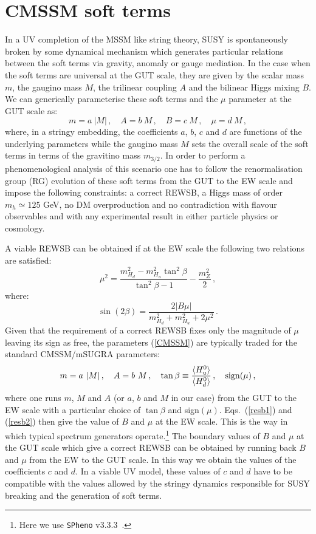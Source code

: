 \documentclass[11pt,a4paper]{article}
\newcommand{\be}{\begin{equation}}
\newcommand{\ee}{\end{equation}}
\begin{document}
\section{CMSSM soft terms}

In a UV completion of the MSSM like string theory, SUSY is spontaneously
broken by some dynamical mechanism which generates particular relations
between the soft terms via gravity, anomaly or gauge mediation. In the
case when the soft terms are universal at the GUT scale, they are given by
the scalar mass $m$, the gaugino mass $M$, the trilinear coupling $A$ and
the bilinear Higgs mixing $B$. We can generically parameterise these soft
terms and the $\mu$ parameter at the GUT scale as:
\be
m = a\ |M|\,,\quad A = b\ M\,,\quad B = c \ M\,, \quad \mu = d\ M\,,
\label{CMSSM}
\ee
where, in a stringy embedding, the coefficients $a$, $b$, $c$ and $d$ are
functions of the underlying parameters while the gaugino mass $M$ sets the
overall scale of the soft terms in terms of the gravitino mass $m_{3/2}$.
In order to perform a phenomenological analysis of this scenario one has
to follow the renormalisation group (RG) evolution of these soft terms
from the GUT to the EW scale and impose the following constraints: a
correct REWSB, a Higgs mass of order $m_h \simeq 125$ GeV, no DM
overproduction and no contradiction with flavour observables and with any
experimental result in either particle physics or cosmology.

A viable REWSB can be obtained if at the EW scale the following two
relations are satisfied:
\be
\mu^2 = \frac{m_{H_d}^2-m_{H_u}^2 
\tan^2\beta}{\tan^2\beta-1}-\frac{m_Z^2}{2}\,,
\label{resb1}
\ee
where:
\be
\sin(2\beta)=\frac{2 |B\mu|}{m_{H_d}^2+m_{H_u}^2 + 2\mu^2}\,.
\label{resb2}
\ee
Given that the requirement of a correct REWSB fixes only the magnitude of
$\mu$ leaving its sign as free, the parameters (\ref{CMSSM}) are typically
traded for the standard CMSSM/mSUGRA parameters:
\be
m = a\ |M|\,,\quad A = b\ M\,,\quad \tan\beta\equiv \frac{\langle
H_u^0\rangle}{\langle H_d^0\rangle}\,, \quad {\rm sign}(\mu)\,,
\label{CMSSMparameters}
\ee
where one runs $m$, $M$ and $A$ (or $a$, $b$ and $M$ in our case) from the
GUT to the EW scale
with a particular choice of $\tan\beta$ and sign$(\mu)$.
Eqs.~(\ref{resb1}) and (\ref{resb2}) then give the value of $B$ and $\mu$
at the EW scale. This is the way in which typical spectrum generators operate.\footnote{Here we use \texttt{SPheno} v3.3.3~\cite{spheno}.}
The boundary values of $B$ and $\mu$ at the GUT scale which give a correct
REWSB can be obtained by running back $B$ and $\mu$ from the EW to the GUT
scale. 
In this way we obtain the values of the coefficients $c$ and $d$.
In a viable UV model, these values of $c$ and $d$ have to be compatible
with the values allowed by the stringy dynamics responsible for SUSY
breaking and the generation of soft terms.
\end{document}
